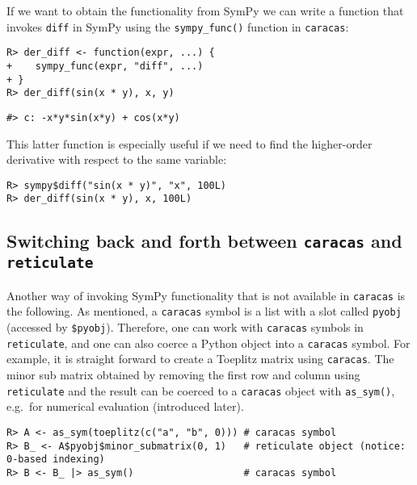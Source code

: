 If we want to obtain
the functionality from SymPy
we can write a function that invokes \texttt{diff} in SymPy using the
\texttt{sympy\_func()} function in \texttt{caracas}:

\begin{verbatim}
R> der_diff <- function(expr, ...) {
+    sympy_func(expr, "diff", ...)
+ }
R> der_diff(sin(x * y), x, y)
\end{verbatim}

\begin{verbatim}
#> c: -x*y*sin(x*y) + cos(x*y)
\end{verbatim}

This latter function is especially useful if we need to find the higher-order
derivative with respect to the same variable:

\begin{verbatim}
R> sympy$diff("sin(x * y)", "x", 100L)
R> der_diff(sin(x * y), x, 100L)
\end{verbatim}

\hypertarget{switching-back-and-forth-between-caracas-and-reticulate}{%
\subsection{\texorpdfstring{Switching back and forth between \texttt{caracas} and \texttt{reticulate}}{Switching back and forth between caracas and reticulate}}\label{switching-back-and-forth-between-caracas-and-reticulate}}

Another way of invoking SymPy functionality that is not available in
\texttt{caracas} is the following. As mentioned, a \texttt{caracas} symbol is a
list with a slot called \texttt{pyobj} (accessed by \texttt{\$pyobj}). Therefore, one can work with
\texttt{caracas} symbols in \texttt{reticulate}, and one can also coerce a Python
object into a \texttt{caracas} symbol. For example, it is straight forward
to create a Toeplitz matrix using \texttt{caracas}. The minor sub matrix
obtained by removing the first row and column using \texttt{reticulate} and
the result can be coerced to a \texttt{caracas} object with \texttt{as\_sym()},
e.g.~for numerical evaluation (introduced later).

\begin{verbatim}
R> A <- as_sym(toeplitz(c("a", "b", 0))) # caracas symbol
R> B_ <- A$pyobj$minor_submatrix(0, 1)   # reticulate object (notice: 0-based indexing)
R> B <- B_ |> as_sym()                   # caracas symbol
\end{verbatim}

